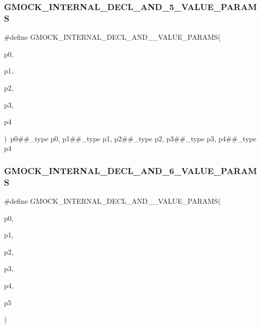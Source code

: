 \subsubsection{\texorpdfstring{GMOCK\_INTERNAL\_DECL\_AND\_5\_VALUE\_PARAMS}{GMOCK\_INTERNAL\_DECL\_AND\_5\_VALUE\_PARAMS}}
{\footnotesize\ttfamily \#define G\+M\+O\+C\+K\+\_\+\+I\+N\+T\+E\+R\+N\+A\+L\+\_\+\+D\+E\+C\+L\+\_\+\+A\+N\+D\+\_\+\_\+\+V\+A\+L\+U\+E\+\_\+\+P\+A\+R\+A\+MS(\begin{DoxyParamCaption}\item[{}]{p0,  }\item[{}]{p1,  }\item[{}]{p2,  }\item[{}]{p3,  }\item[{}]{p4 }\end{DoxyParamCaption})~p0\#\#\+\_\+type p0, p1\#\#\+\_\+type p1, p2\#\#\+\_\+type p2, p3\#\#\+\_\+type p3, p4\#\#\+\_\+type p4}

\mbox{\label{_obj__test_2lib_2googletest-master_2googlemock_2include_2gmock_2gmock-generated-actions_8h_a80b3221bf467d72d15120045c9f52a6e}} 
\subsubsection{\texorpdfstring{GMOCK\_INTERNAL\_DECL\_AND\_6\_VALUE\_PARAMS}{GMOCK\_INTERNAL\_DECL\_AND\_6\_VALUE\_PARAMS}}
{\footnotesize\ttfamily \#define G\+M\+O\+C\+K\+\_\+\+I\+N\+T\+E\+R\+N\+A\+L\+\_\+\+D\+E\+C\+L\+\_\+\+A\+N\+D\+\_\+\_\+\+V\+A\+L\+U\+E\+\_\+\+P\+A\+R\+A\+MS(\begin{DoxyParamCaption}\item[{}]{p0,  }\item[{}]{p1,  }\item[{}]{p2,  }\item[{}]{p3,  }\item[{}]{p4,  }\item[{}]{p5 }\end{DoxyParamCaption})}

